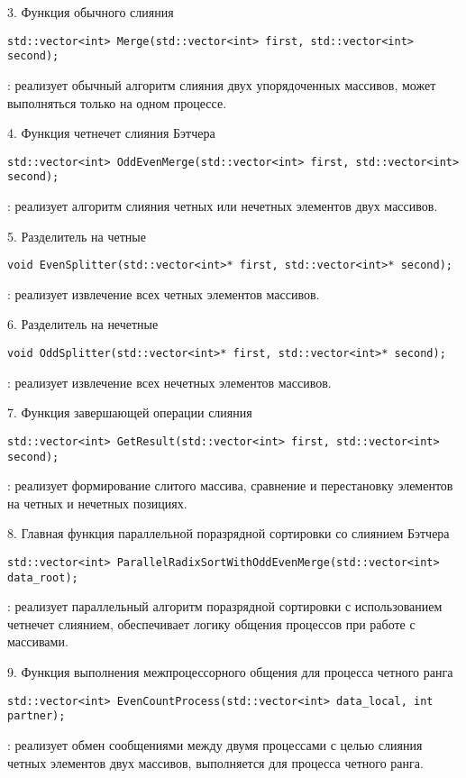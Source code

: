 \documentclass[12pt]{report}
\begin{document}
\par 3. Функция обычного слияния
\begin{lstlisting}
std::vector<int> Merge(std::vector<int> first, std::vector<int> second);
\end{lstlisting}
: реализует обычный алгоритм слияния двух упорядоченных массивов, может выполняться только на одном процессе.

\par 4. Функция четнечет слияния Бэтчера
\begin{lstlisting}
std::vector<int> OddEvenMerge(std::vector<int> first, std::vector<int> second);
\end{lstlisting}
: реализует алгоритм слияния четных или нечетных элементов двух массивов.

\par 5. Разделитель на четные
\begin{lstlisting}
void EvenSplitter(std::vector<int>* first, std::vector<int>* second);
\end{lstlisting}
: реализует извлечение всех четных элементов массивов.

\par 6. Разделитель на нечетные
\begin{lstlisting}
void OddSplitter(std::vector<int>* first, std::vector<int>* second);
\end{lstlisting}
: реализует извлечение всех нечетных элементов массивов.

\par 7. Функция завершающей операции слияния
\begin{lstlisting}
std::vector<int> GetResult(std::vector<int> first, std::vector<int> second);
\end{lstlisting}
: реализует формирование слитого массива, сравнение и перестановку элементов на четных и нечетных позициях.

\par 8. Главная функция параллельной поразрядной сортировки со слиянием Бэтчера
\begin{lstlisting}
std::vector<int> ParallelRadixSortWithOddEvenMerge(std::vector<int> data_root);
\end{lstlisting}
: реализует параллельный алгоритм поразрядной сортировки с использованием четнечет слиянием, обеспечивает логику общения процессов при работе с массивами.

\par 9. Функция выполнения межпроцессорного общения для процесса четного ранга
\begin{lstlisting}
std::vector<int> EvenCountProcess(std::vector<int> data_local, int partner);
\end{lstlisting}
: реализует обмен сообщениями между двумя процессами с целью слияния четных элементов двух массивов, выполняется для процесса четного ранга.
\end{document}

